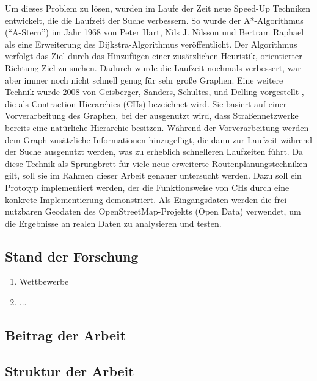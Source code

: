Um dieses Problem zu lösen, wurden im Laufe der Zeit neue Speed-Up Techniken entwickelt, die die
Laufzeit der Suche verbessern. So wurde \ua der A*-Algorithmus ("`A-Stern"') im Jahr 1968 von Peter
Hart, Nils J. Nilsson und Bertram Raphael als eine Erweiterung des Dijkstra-Algorithmus
veröffentlicht. Der Algorithmus verfolgt das Ziel durch das Hinzufügen einer
zusätzlichen Heuristik, orientierter Richtung Ziel zu suchen. Dadurch wurde die Laufzeit
nochmals verbessert, war aber immer noch nicht schnell genug für sehr große Graphen.
Eine weitere Technik wurde 2008 von Geisberger, Sanders, Schultes, und Delling vorgestellt
\cite{geisberger.workshop}, die als Contraction Hierarchies (CHs) bezeichnet wird. Sie basiert auf
einer Vorverarbeitung des Graphen, bei der ausgenutzt wird, dass Straßennetzwerke bereits eine
natürliche Hierarchie besitzen. Während der Vorverarbeitung werden dem Graph zusätzliche
Informationen hinzugefügt, die dann zur Laufzeit während der Suche ausgenutzt werden, was zu
erheblich schnelleren Laufzeiten führt. Da diese Technik als Sprungbrett für viele neue erweiterte
Routenplanungstechniken gilt, soll sie im Rahmen dieser Arbeit genauer untersucht werden. Dazu soll
ein Prototyp implementiert werden, der die Funktionsweise von CHs durch eine konkrete
Implementierung demonstriert. Als Eingangsdaten werden die frei nutzbaren Geodaten des
OpenStreetMap-Projekts (Open Data)  verwendet, um die Ergebnisse an realen Daten zu
analysieren und testen.


\subsection{Stand der Forschung}
\begin{enumerate}
    \item Wettbewerbe
    \item ...
\end{enumerate}

\subsection{Beitrag der Arbeit}

\subsection{Struktur der Arbeit}
